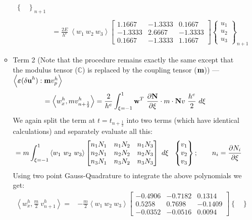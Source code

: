 \begin{itemize}
\begin{itemize}
\begin{align*}
\begin{Bmatrix}
\end{Bmatrix}_{n+1} \\ \\
& =
\frac{2E}{h^e}\ \left< w_1\ w_2\ w_3
\right>
\begin{bmatrix}
1.1667 &  -1.3333   & 0.1667 \\
   -1.3333 &   2.6667  & -1.3333 \\
    0.1667 &  -1.3333  &  1.1667
\end{bmatrix}
\begin{Bmatrix}
u_1\\u_2\\u_3
\end{Bmatrix}_{n+1}
\end{align*}
\item Term 2 (Note that the procedure remains exactly the same except that the modulus tensor ($\mathbb{C}$) is replaced by the coupling tensor ($\bf m$)) --- $\left<
\bm\varepsilon({\bf \delta u}^h) : {\bf m} v^h_p
\right>$
\begin{align*}
& = \left<
w^h_x, m v^h_{n+\frac{1}{2}}
\right>  = \frac{2}{h^e} \int_{\xi = -1}^{1} {\bf w}^T\ \frac{\partial {\bf N}}{\partial {\xi}} \cdot m \cdot {\bf N} {v}\ \frac{h^e}{2}\ d\xi
\end{align*}
We again split the term at $t=t_{n+\frac{1}{2}}$ into two terms (which have identical calculations) and separately evaluate all this:  
\begin{align*}
& = m \int_{\xi = -1}^1 
\left< w_1\ w_2\ w_3
\right>
\begin{bmatrix}
n_1N_1 & n_1N_2 & n_1N_3 \\
n_2N_1 & n_2N_2 & n_2N_3 \\
n_3N_1 & n_3N_2 & n_3N_3 
\end{bmatrix}\ d\xi \ \ 
\begin{Bmatrix}
v_1\\v_2\\v_3
\end{Bmatrix}
; \ \ \ \ \ \ n_i = \del{N_i}{\xi}
\end{align*}
Using two point Gauss-Quadrature to integrate the above polynomials we get: 
\begin{align*}
\left<
w^h_x, \frac{m}{2}\ v^h_{n+1}
\right>
=
& -\frac{m}{2}\left< w_1\ w_2\ w_3
\right>
\begin{bmatrix}
-0.4906 &  -0.7182    &0.1314\\
    0.5258 &   0.7698&   -0.1409\\
   -0.0352  & -0.0516  &  0.0094
\end{bmatrix}\begin{Bmatrix}

\end{Bmatrix}
\end{align*}
\end{itemize}
\end{itemize}
